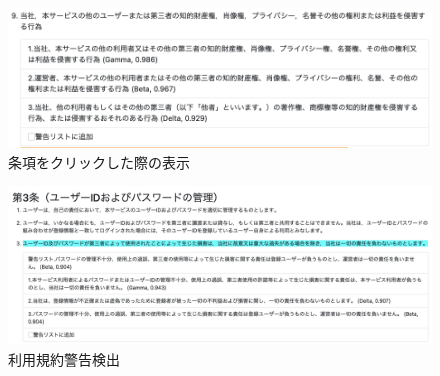 \begin{figure}[h]
  \begin{center}
      \includegraphics[width=16cm]{img/tospull3.png}
      \caption{条項をクリックした際の表示}
      \label{img:条項をクリックした際の表示}
  \end{center}
\end{figure}
\begin{figure}[h]
  \begin{center}
      \includegraphics[width=16cm]{img/toswarning.png}
      \caption{利用規約警告検出}
      \label{img:利用規約警告検出}
  \end{center}
\end{figure}


